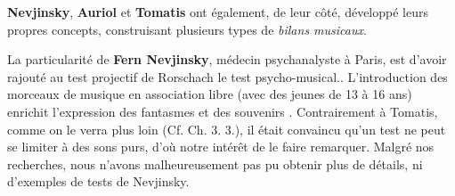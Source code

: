 



        \textbf{Nevjinsky}\autocite{nevjinsky:adolescence},\textbf{ Auriol}\autocite{auriol:cle}
      et \textbf{Tomatis} \autocite {tomatisoreilletvie} ont également, de leur côté, développé leurs propres
                   concepts, construisant plusieurs types de \emph{bilans musicaux}.

La particularité de \textbf{Fern Nevjinsky}, médecin psychanalyste à
  Paris, est d'avoir rajouté au test projectif de Rorschach le test psycho-musical.\autocite{nevjinsky:adolescence}.
L'introduction des morceaux de musique en association libre (avec
 des jeunes de 13 à 16 ans) enrichit l'expression des fantasmes et des
 souvenirs \autocite{nevjinsky:adolescence}. %
Contrairement à Tomatis, comme on le verra plus loin (Cf. Ch. 3. 3.), il était convaincu qu'un test ne peut 
se limiter à des sons purs, d'où notre intérêt de le faire remarquer. Malgré nos recherches, nous n'avons 
malheureusement pas pu obtenir plus de détails, ni d'exemples de tests de Nevjinsky.



